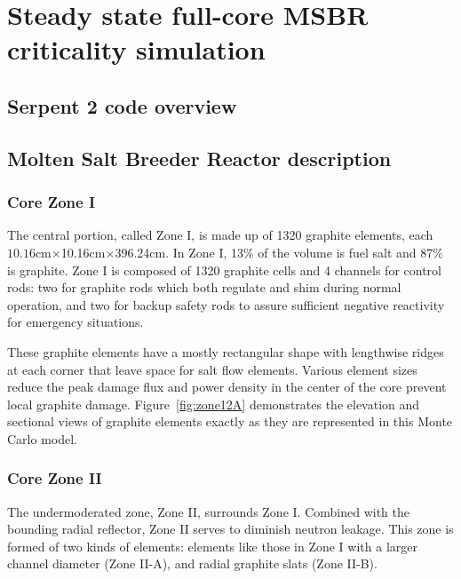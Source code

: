 \chapter[Steady state full-core MSBR criticality simulation]{Steady state full-core MSBR criticality simulation}

\section{Serpent 2 code overview}

\section{Molten Salt Breeder Reactor description}

\subsection{Core Zone I}

The central portion, called Zone I, is made up of 1320 graphite elements, each 
$10.16$cm$\times$10.16cm$\times$396.24cm.
In Zone I, 13\% of the volume is fuel salt and 87\% is graphite. Zone I is 
composed of 1320 graphite cells and 4 channels for control rods: two for 
graphite rods which both regulate and shim during normal operation, and two
for backup safety rods to assure sufficient negative reactivity for emergency 
situations.

These graphite elements have a mostly rectangular shape with lengthwise ridges 
at each corner that leave space for salt flow elements. Various element sizes 
reduce the peak damage flux and power density in the center of the core prevent 
local graphite damage. Figure~\ref{fig:zone12A} demonstrates the elevation and 
sectional views of graphite elements exactly as they are represented in this 
Monte Carlo model.

\subsection{Core Zone II}
The undermoderated zone, Zone II, surrounds Zone I.
Combined with the bounding radial reflector, Zone II serves to diminish neutron 
leakage. This zone is formed of two kinds of elements: elements like those in 
Zone I with a larger channel diameter (Zone II-A), and radial
graphite slats (Zone II-B). 

